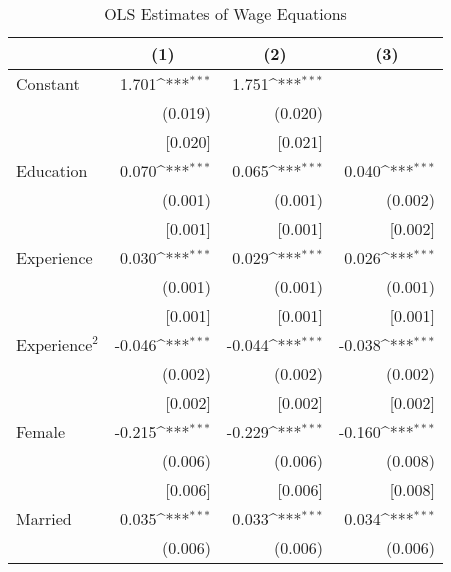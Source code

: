 \begin{table}[htbp]\centering
\def\sym#1{\ifmmode^{#1}\else\(^{#1}\)\fi}
\caption{OLS Estimates of Wage Equations\label{reg:ols_comp}}
\begin{tabular}{l*{3}{D{.}{.}{-1}}}
\toprule
                    &         &         &         \\
\midrule
Constant            &       1.701\sym{***}&       1.751\sym{***}&                     \\
                    &     (0.019)         &     (0.020)         &                     \\
                    &     [0.020]         &     [0.021]         &                     \\
Education           &       0.070\sym{***}&       0.065\sym{***}&       0.040\sym{***}\\
                    &     (0.001)         &     (0.001)         &     (0.002)         \\
                    &     [0.001]         &     [0.001]         &     [0.002]         \\
Experience          &       0.030\sym{***}&       0.029\sym{***}&       0.026\sym{***}\\
                    &     (0.001)         &     (0.001)         &     (0.001)         \\
                    &     [0.001]         &     [0.001]         &     [0.001]         \\
\ensuremath{\text{Experience}^{2}}&      -0.046\sym{***}&      -0.044\sym{***}&      -0.038\sym{***}\\
                    &     (0.002)         &     (0.002)         &     (0.002)         \\
                    &     [0.002]         &     [0.002]         &     [0.002]         \\
Female              &      -0.215\sym{***}&      -0.229\sym{***}&      -0.160\sym{***}\\
                    &     (0.006)         &     (0.006)         &     (0.008)         \\
                    &     [0.006]         &     [0.006]         &     [0.008]         \\
Married             &       0.035\sym{***}&       0.033\sym{***}&       0.034\sym{***}\\
                    &     (0.006)         &     (0.006)         &     (0.006)         \\

\end{tabular}
\end{table}

